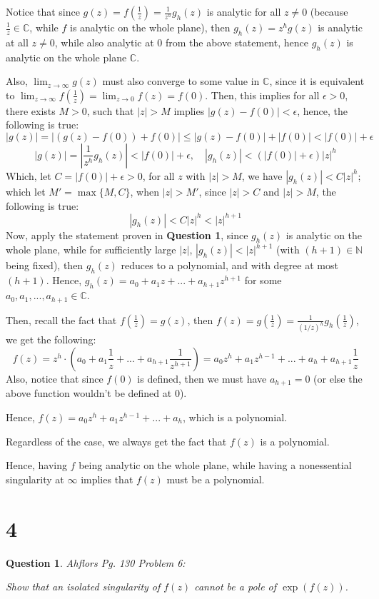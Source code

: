 \documentclass{article}
\newtheorem{question}{Question}
\begin{document}
Notice that since $g(z)=f(\frac{1}{z})=\frac{1}{z^h}g_h(z)$ is analytic for all $z\neq 0$ (because $\frac{1}{z}\in\mathbb{C}$, while $f$ is analytic on the whole plane),
then $g_h(z) = z^hg(z)$ is analytic at all $z\neq 0$, while also analytic at $0$ from the above statement, hence $g_h(z)$ is analytic on the whole plane $\mathbb{C}$.

Also, $\lim_{z\rightarrow\infty}g(z)$ must also converge to some value in $\mathbb{C}$, since it is equivalent to $\lim_{z\rightarrow\infty}f(\frac{1}{z})=\lim_{z\rightarrow 0}f(z)=f(0)$.
Then, this implies for all $\epsilon>0$, there exists $M>0$, such that $|z|>M$ implies $|g(z)-f(0)| < \epsilon$,
hence, the following is true:
$$|g(z)| = |(g(z)-f(0))+f(0)| \leq |g(z)-f(0)|+|f(0)| < |f(0)|+\epsilon$$
$$|g(z)|=\left|\frac{1}{z^h}g_h(z)\right| < |f(0)|+\epsilon,\quad |g_h(z)| < (|f(0)|+\epsilon)|z|^h$$
Which, let $C=|f(0)|+\epsilon>0$, for all $z$ with $|z|>M$, we have $|g_h(z)| < C|z|^h$; which let $M'=\max\{M, C\}$, when $|z|>M'$,
since $|z|>C$ and $|z|>M$, the following is true:
$$|g_h(z)|<C|z|^h < |z|^{h+1}$$
Now, apply the statement proven in \textbf{Question 1}, since $g_h(z)$ is analytic on the whole plane, while for sufficiently large $|z|$, $|g_h(z)|< |z|^{h+1}$ (with $(h+1)\in\mathbb{N}$ being fixed),
then $g_h(z)$ reduces to a polynomial, and with degree at most $(h+1)$. Hence, $g_h(z)=a_0+a_1z+...+a_{h+1}z^{h+1}$ for some $a_0,a_1,...,a_{h+1}\in\mathbb{C}$.

Then, recall the fact that $f(\frac{1}{z})=g(z)$, then $f(z)=g(\frac{1}{z})=\frac{1}{(1/z)^h}g_h(\frac{1}{z})$, we get the following:
$$f(z)=z^h\cdot \left(a_0+a_1\frac{1}{z}+...+a_{h+1}\frac{1}{z^{h+1}}\right) = a_0z^h + a_1z^{h-1}+...+a_h+a_{h+1}\frac{1}{z}$$
Also, notice that since $f(0)$ is defined, then we must have $a_{h+1}=0$ (or else the above function wouldn't be defined at $0$).

Hence, $f(z)=a_0z^h + a_1z^{h-1}+...+a_h$, which is a polynomial.

\hfill

\hfill

Regardless of the case, we always get the fact that $f(z)$ is a polynomial.

Hence, having $f$ being analytic on the whole plane,
while having a nonessential singularity at $\infty$ implies that $f(z)$ must be a polynomial.


\break

\section*{4}
\begin{myBox}[]{}
    \begin{question}
        Ahflors Pg. 130 Problem 6:

        Show that an isolated singularity of $f(z)$ cannot be a pole of $\exp(f(z))$.
    \end{question}
\end{myBox}
\end{document}
